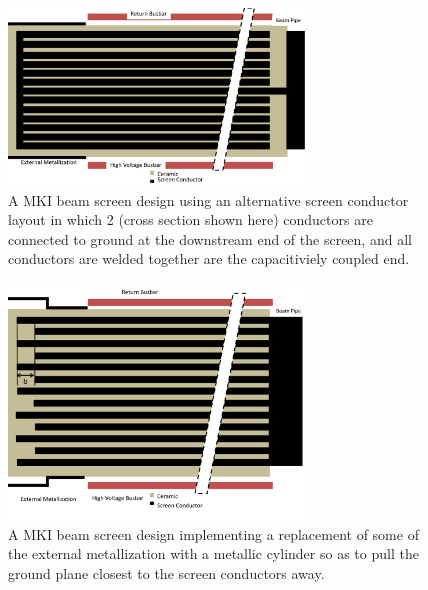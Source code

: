 \begin{figure}
\begin{center}
\includegraphics[width=0.7\textwidth]{LHC_MKI/figures/mki-design-layouts/alternative_screen_design.pdf}
\end{center}
\label{fig:alt-screen-design}
\caption{A MKI beam screen design using an alternative screen conductor layout in which 2 (cross section shown here) conductors are connected to ground at the downstream end of the screen, and all conductors are welded together are the capacitiviely coupled end.}
\end{figure}

\begin{figure}
\begin{center}
\includegraphics[width=0.7\textwidth]{LHC_MKI/figures/mki-design-layouts/alternating_screen_conductors_step_out_metallisation.pdf}
\end{center}
\label{fig:24-step-out-slight}
\caption{A MKI beam screen design implementing a replacement of some of the external metallization with a metallic cylinder so as to pull the ground plane closest to the screen conductors away.}
\end{figure}

